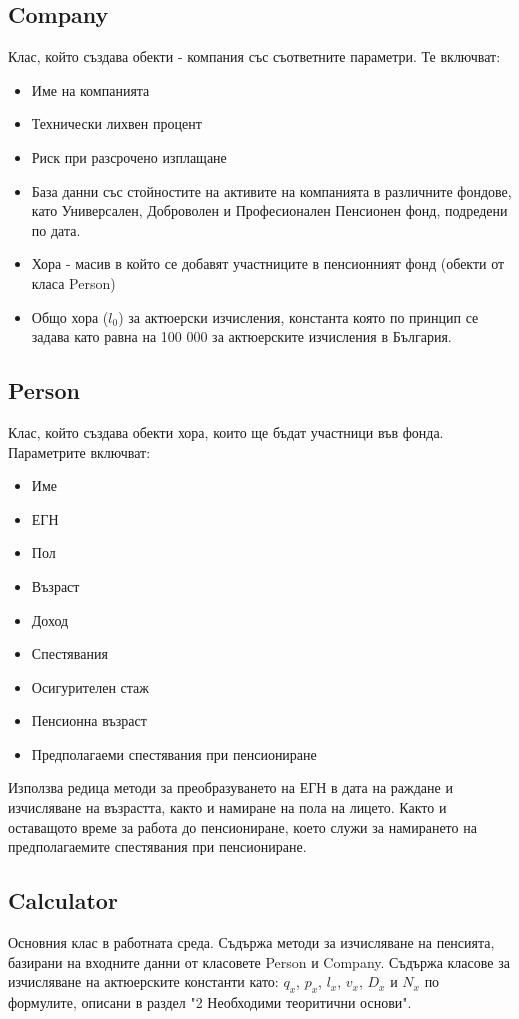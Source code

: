 \documentclass[a4paper,12pt]{article}
\begin{document}
\subsection{Company}
Клас, който създава обекти - компания със съответните параметри. Те включват:
\begin{itemize}
        \item Име на компанията
        \item Технически лихвен процент
        \item Риск при разсрочено изплащане
        \item База данни със стойностите на активите на компанията в различните фондове, като Универсален, Доброволен и Професионален Пенсионен фонд, подредени по дата.
        \item Хора - масив в който се добавят участниците в пенсионният фонд (обекти от класа Person)
        \item Общо хора ($l_0$) за актюерски изчисления, константа която по принцип се задава като равна на 100 000 за актюерските изчисления в България.
\end{itemize}

\subsection{Person}
Клас, който създава обекти хора, които ще бъдат участници във фонда. Параметрите включват:
\begin{itemize}
        \item Име
        \item ЕГН
        \item Пол
        \item Възраст
        \item Доход
        \item Спестявания
        \item Осигурителен стаж
        \item Пенсионна възраст
        \item Предполагаеми спестявания при пенсиониране
\end{itemize}
Използва редица методи за преобразуването на ЕГН в дата на раждане и изчисляване на възрастта, както и намиране на пола на лицето. Както и оставащото време за работа до пенсиониране, което служи за намирането на предполагаемите спестявания при пенсиониране.
\subsection{Calculator}
Основния клас в работната среда. Съдържа методи за изчисляване на пенсията, базирани на входните данни от класовете Person и Company.
\newline
Съдържа класове за изчисляване на актюерските константи като: $q_x$, $p_x$, $l_x$, $v_x$, $D_x$ и $N_x$ по формулите, описани в раздел "2 Необходими теоритични основи".
\end{document}
